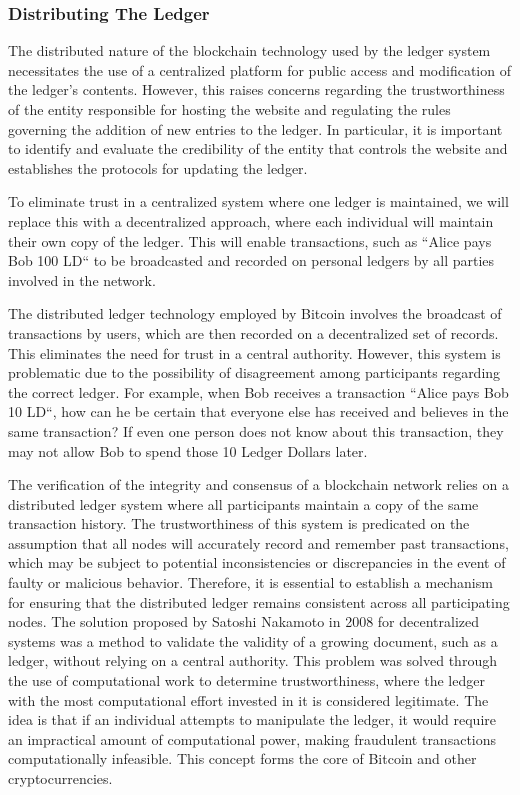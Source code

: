 \subsubsection{Distributing The Ledger}
The distributed nature of the blockchain technology used by the ledger system necessitates the use of a centralized platform
for public access and modification of the ledger's contents. However, this raises concerns regarding the trustworthiness
of the entity responsible for hosting the website and regulating the rules governing the addition of new entries to the
ledger. In particular, it is important to identify and evaluate the credibility of the entity that controls the website
and establishes the protocols for updating the ledger.

To eliminate trust in a centralized system where one ledger is maintained, we will replace this with a decentralized approach,
where each individual will maintain their own copy of the ledger. This will enable transactions, such as ``Alice pays Bob 100 LD``
to be broadcasted and recorded on personal ledgers by all parties involved in the network.

The distributed ledger technology employed by Bitcoin involves the broadcast of transactions by users, which are then recorded
on a decentralized set of records. This eliminates the need for trust in a central authority. However, this system is problematic
due to the possibility of disagreement among participants regarding the correct ledger. For example, when Bob receives a
transaction ``Alice pays Bob 10 LD``, how can he be certain that everyone else has received and believes in the same transaction?
If even one person does not know about this transaction, they may not allow Bob to spend those 10 Ledger Dollars later.

%

The verification of the integrity and consensus of a blockchain network relies on a distributed ledger system where all
participants maintain a copy of the same transaction history. The trustworthiness of this system is predicated on the assumption
that all nodes will accurately record and remember past transactions, which may be subject to potential inconsistencies
or discrepancies in the event of faulty or malicious behavior. Therefore, it is essential to establish a mechanism for
ensuring that the distributed ledger remains consistent across all participating nodes. The solution proposed by Satoshi
Nakamoto in 2008 for decentralized systems was a method to validate the validity of a growing document, such as a ledger,
without relying on a central authority. This problem was solved through the use of computational work to determine trustworthiness,
where the ledger with the most computational effort invested in it is considered legitimate. The idea is that if an individual
attempts to manipulate the ledger, it would require an impractical amount of computational power, making fraudulent transactions
computationally infeasible. This concept forms the core of Bitcoin and other cryptocurrencies.
